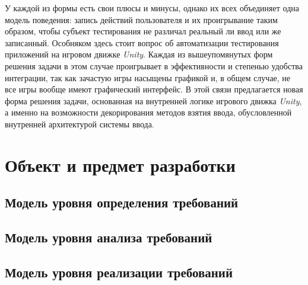 У каждой из формы есть свои плюсы и минусы, однако их всех объединяет одна модель поведения: запись действий пользователя и их проигрывание таким образом, чтобы субъект тестирования не различал реальный ли ввод или же записанный. Особняком здесь стоит вопрос об автоматизации тестирования приложений на игровом движке \textit{Unity}. Каждая из вышеупомянутых форм решения задачи в этом случае проигрывает в эффективности и степенью удобства интеграции, так как зачастую игры насыщены графикой и, в общем случае, не все игры вообще имеют графический интерфейс. В этой связи предлагается новая форма решения задачи, основанная на внутренней логике игрового движка \textit{Unity}, а именно на возможности декорирования методов взятия ввода, обусловленной внутренней архитектурой системы ввода.

\section*{Объект и предмет разработки}
\subsection*{Модель уровня определения требований}
\subsection*{Модель уровня анализа требований}
\subsection*{Модель уровня реализации требований}